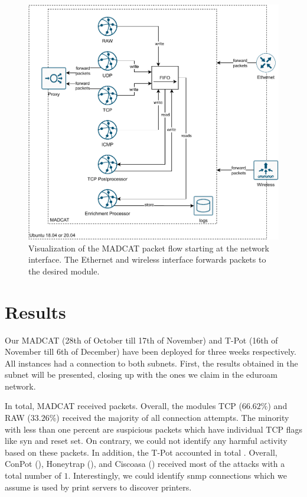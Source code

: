 \begin{figure}
    \centering
    \includegraphics[width=\textwidth]{figures/heicat-architecture.pdf}
    \caption[Visualization of the MADCAT packet flow]{Visualization of the MADCAT packet flow starting at the network interface. The Ethernet and wireless interface forwards packets to the desired module.}
    \label{fig:madcat-architecture}
\end{figure}

\section{Results} %

Our MADCAT (28th of October till 17th of November) and T-Pot (16th of November till 6th of December) have been deployed for three weeks respectively.
All instances had a connection to both subnets.
First, the results obtained in the subnet  will be presented, closing up with the ones we claim in the eduroam network.

In total, MADCAT received  packets.
Overall, the modules TCP ($66.62\%$) and RAW ($33.26\%$) received the majority of all connection attempts.
The minority with less than one percent are suspicious packets which have individual TCP flags like syn and reset set. 
On contrary, we could not identify any harmful activity based on these packets.
In addition, the T-Pot accounted in total .
Overall, ConPot (), Honeytrap (), and Ciscoasa () received most of the attacks with a total number of $1$.
Interestingly, we could identify \ac{snmp} connections which we assume is used by print servers to discover printers.

